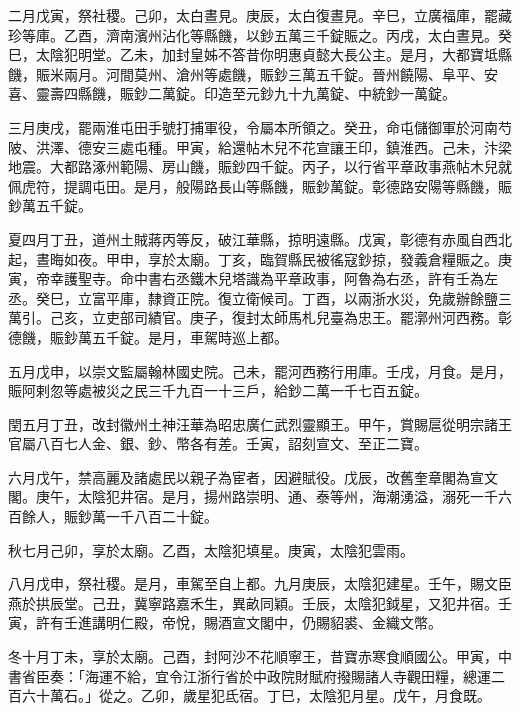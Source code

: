 \begin{pinyinscope}
 二月戊寅，祭社稷。己卯，太白晝見。庚辰，太白復晝見。辛巳，立廣福庫，罷藏珍等庫。乙酉，濟南濱州沾化等縣饑，以鈔五萬三千錠賑之。丙戌，太白晝見。癸巳，太陰犯明堂。乙未，加封皇姊不答昔你明惠貞懿大長公主。是月，大都寶坻縣饑，賑米兩月。河間莫州、滄州等處饑，賑鈔三萬五千錠。晉州饒陽、阜平、安喜、靈壽四縣饑，賑鈔二萬錠。印造至元鈔九十九萬錠、中統鈔一萬錠。



 三月庚戌，罷兩淮屯田手號打捕軍役，令屬本所領之。癸丑，命屯儲御軍於河南芍陂、洪澤、德安三處屯種。甲寅，給還帖木兒不花宣讓王印，鎮淮西。己未，汴梁地震。大都路涿州範陽、房山饑，賑鈔四千錠。丙子，以行省平章政事燕帖木兒就佩虎符，提調屯田。是月，般陽路長山等縣饑，賑鈔萬錠。彰德路安陽等縣饑，賑鈔萬五千錠。



 夏四月丁丑，道州土賊蔣丙等反，破江華縣，掠明遠縣。戊寅，彰德有赤風自西北起，晝晦如夜。甲申，享於太廟。丁亥，臨賀縣民被徭寇鈔掠，發義倉糧賑之。庚寅，帝幸護聖寺。命中書右丞鐵木兒塔識為平章政事，阿魯為右丞，許有壬為左丞。癸巳，立富平庫，隸資正院。復立衛候司。丁酉，以兩浙水災，免歲辦餘鹽三萬引。己亥，立吏部司績官。庚子，復封太師馬札兒臺為忠王。罷漷州河西務。彰德饑，賑鈔萬五千錠。是月，車駕時巡上都。



 五月戊申，以崇文監屬翰林國史院。己未，罷河西務行用庫。壬戌，月食。是月，賑阿剌忽等處被災之民三千九百一十三戶，給鈔二萬一千七百五錠。



 閏五月丁丑，改封徽州土神汪華為昭忠廣仁武烈靈顯王。甲午，賞賜扈從明宗諸王官屬八百七人金、銀、鈔、幣各有差。壬寅，詔刻宣文、至正二寶。



 六月戊午，禁高麗及諸處民以親子為宦者，因避賦役。戊辰，改舊奎章閣為宣文閣。庚午，太陰犯井宿。是月，揚州路崇明、通、泰等州，海潮湧溢，溺死一千六百餘人，賑鈔萬一千八百二十錠。



 秋七月己卯，享於太廟。乙酉，太陰犯填星。庚寅，太陰犯雲雨。



 八月戊申，祭社稷。是月，車駕至自上都。九月庚辰，太陰犯建星。壬午，賜文臣燕於拱辰堂。己丑，冀寧路嘉禾生，異畝同穎。壬辰，太陰犯鉞星，又犯井宿。壬寅，許有壬進講明仁殿，帝悅，賜酒宣文閣中，仍賜貂裘、金織文幣。



 冬十月丁未，享於太廟。己酉，封阿沙不花順寧王，昔寶赤寒食順國公。甲寅，中書省臣奏：「海運不給，宜令江浙行省於中政院財賦府撥賜諸人寺觀田糧，總運二百六十萬石。」從之。乙卯，歲星犯氐宿。丁巳，太陰犯月星。戊午，月食既。




\end{pinyinscope}

